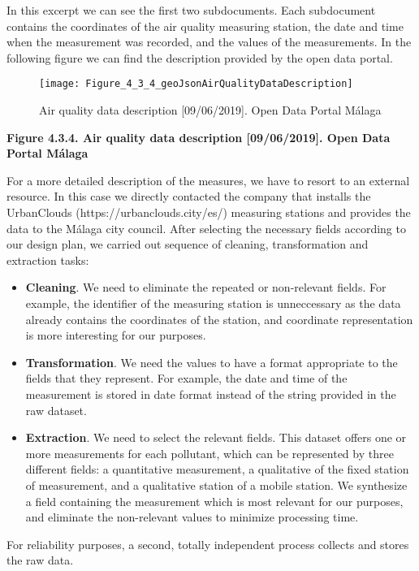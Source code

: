 In this excerpt we can see the first two subdocuments.
Each subdocument contains the coordinates of the air quality measuring station, the date and time when the measurement was recorded, and the values of the measurements.
In the following figure we can find the description provided by the open data portal.\\
    
\begin{figure}[ht]
    \centering
    \texttt{[image: Figure\_4\_3\_4\_geoJsonAirQualityDataDescription]}
    \caption{Air quality data description [09/06/2019]. Open Data Portal Málaga}
\end{figure}
\begin{center}
    \bf{        
    Figure 4.3.4. Air quality data description [09/06/2019]. Open Data Portal Málaga}
\end{center}

For a more detailed description of the measures, we have to resort to an external resource.
In this case we directly contacted the company that installs the UrbanClouds (https://urbanclouds.city/es/) measuring stations and provides the data to the Málaga city council.
After selecting the necessary fields according to our design plan, we carried out sequence of cleaning, transformation and extraction tasks:

\begin{itemize}
    \item \textbf{Cleaning}. We need to eliminate the repeated or non-relevant fields.
        For example, the identifier of the measuring station is unneccessary as the data already contains the coordinates of the station, and coordinate representation is more interesting for our purposes.

    \item \textbf{Transformation}. We need the values to have a format appropriate to the fields that they represent.
        For example, the date and time of the measurement is stored in date format instead of the string provided in the raw dataset.

    \item \textbf{Extraction}. We need to select the relevant fields.
        This dataset offers one or more measurements for each pollutant, which can be represented by three different fields:
        a quantitative measurement, a qualitative of the fixed station of measurement, and a qualitative station of a mobile station.
        We synthesize a field containing the measurement which is most relevant for our purposes, and eliminate the non-relevant values to minimize processing time.
\end{itemize}

For reliability purposes, a second, totally independent process collects and stores the raw data.
